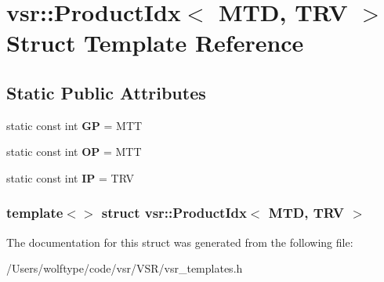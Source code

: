 \hypertarget{structvsr_1_1_product_idx_3_01_m_t_d_00_01_t_r_v_01_4}{\section{vsr\-:\-:Product\-Idx$<$ M\-T\-D, T\-R\-V $>$ Struct Template Reference}
\label{structvsr_1_1_product_idx_3_01_m_t_d_00_01_t_r_v_01_4}
}
\subsection*{Static Public Attributes}
\begin{DoxyCompactItemize}
\item 
\hypertarget{structvsr_1_1_product_idx_3_01_m_t_d_00_01_t_r_v_01_4_acaa02ffc7f976f78e4388992149974d8}{static const int {\bfseries G\-P} = M\-T\-T}\label{structvsr_1_1_product_idx_3_01_m_t_d_00_01_t_r_v_01_4_acaa02ffc7f976f78e4388992149974d8}

\item 
\hypertarget{structvsr_1_1_product_idx_3_01_m_t_d_00_01_t_r_v_01_4_ad1727aa9547a6532e7edf727148e0b73}{static const int {\bfseries O\-P} = M\-T\-T}\label{structvsr_1_1_product_idx_3_01_m_t_d_00_01_t_r_v_01_4_ad1727aa9547a6532e7edf727148e0b73}

\item 
\hypertarget{structvsr_1_1_product_idx_3_01_m_t_d_00_01_t_r_v_01_4_ac81a6d044c50ec60eec12bb5be4f03cc}{static const int {\bfseries I\-P} = T\-R\-V}\label{structvsr_1_1_product_idx_3_01_m_t_d_00_01_t_r_v_01_4_ac81a6d044c50ec60eec12bb5be4f03cc}

\end{DoxyCompactItemize}
\subsubsection*{template$<$$>$ struct vsr\-::\-Product\-Idx$<$ M\-T\-D, T\-R\-V $>$}



The documentation for this struct was generated from the following file\-:\begin{DoxyCompactItemize}
\item 
/\-Users/wolftype/code/vsr/\-V\-S\-R/vsr\-\_\-templates.\-h\end{DoxyCompactItemize}
